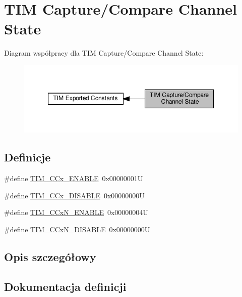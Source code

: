 \hypertarget{group___channel___c_c___state}{}\section{T\+IM Capture/\+Compare Channel State}
\label{group___channel___c_c___state}
Diagram współpracy dla T\+IM Capture/\+Compare Channel State\+:\nopagebreak
\begin{figure}[H]
\begin{center}
\leavevmode
\includegraphics[width=350pt]{group___channel___c_c___state}
\end{center}
\end{figure}
\subsection*{Definicje}
\begin{DoxyCompactItemize}
\item 
\#define \hyperlink{group___channel___c_c___state_ga7b214df0d5c67138de7bc84e937909f0}{T\+I\+M\+\_\+\+C\+Cx\+\_\+\+E\+N\+A\+B\+LE}~0x00000001U
\item 
\#define \hyperlink{group___channel___c_c___state_ga5068d16e01778cd3bd09555013b2f4d3}{T\+I\+M\+\_\+\+C\+Cx\+\_\+\+D\+I\+S\+A\+B\+LE}~0x00000000U
\item 
\#define \hyperlink{group___channel___c_c___state_ga69ecb0bf5dcd5ecf30af36d6fc00ea0d}{T\+I\+M\+\_\+\+C\+Cx\+N\+\_\+\+E\+N\+A\+B\+LE}~0x00000004U
\item 
\#define \hyperlink{group___channel___c_c___state_ga241183326d83407f7cc7dbd292533240}{T\+I\+M\+\_\+\+C\+Cx\+N\+\_\+\+D\+I\+S\+A\+B\+LE}~0x00000000U
\end{DoxyCompactItemize}


\subsection{Opis szczegółowy}


\subsection{Dokumentacja definicji}
\mbox{\label{group___channel___c_c___state_ga5068d16e01778cd3bd09555013b2f4d3}} 
